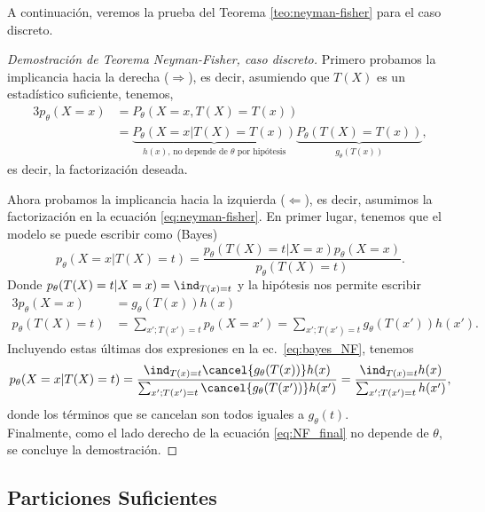 A continuación, veremos la prueba del Teorema \ref{teo:neyman-fisher} para el caso discreto. 


\begin{proof}[Demostración de Teorema Neyman-Fisher, caso discreto]
Primero probamos la implicancia hacia la derecha ($\Rightarrow$), es decir, asumiendo que $T(X)$ es un estadístico suficiente, tenemos,
	\begin{alignat*}{3}
		p_\theta(X=x) 	&= P_\theta(X=x, T(X)=T(x))\\
						&= \underbrace{P_\theta(X=x| T(X)=T(x))}_{h(x)\text{, no depende de $\theta$ por hipótesis}} \underbrace{P_\theta(T(X)=T(x))}_{g_\theta(T(x))},
	\end{alignat*}
	es decir, la factorización deseada.

	Ahora probamos la implicancia hacia la izquierda ($\Leftarrow$), es decir, asumimos la factorización en la ecuación \eqref{eq:neyman-fisher}. En primer lugar, tenemos que el modelo se puede escribir como (Bayes)
	\begin{equation}
		\label{eq:bayes_NF}
		p_\theta(X=x|T(X)=t)=  \frac{p_\theta(T(X)=t|X=x)p_\theta(X=x)}{p_\theta(T(X)=t)}.
	\end{equation}
	Donde $p_\theta(T(X)=t|X=x)= \ind_{T(x)=t}$ y la hipótesis nos permite escribir 
	\begin{alignat*}{3}
		p_\theta(X=x)&=  g_\theta(T(x))h(x)\\
		p_\theta(T(X)=t) &= \sum_{x';T(x')=t}p_\theta(X=x') = \sum_{x';T(x')=t}g_\theta(T(x'))h(x').
	\end{alignat*}
	Incluyendo estas últimas dos expresiones en la ec.~\eqref{eq:bayes_NF}, tenemos 
	\begin{equation}
		\label{eq:NF_final}
		p_\theta(X=x|T(X)=t)=  \frac{\ind_{T(x)=t}\cancel{g_\theta(T(x))}h(x)}{\sum_{x';T(x')=t}\cancel{g_\theta(T(x'))}h(x')}=  \frac{\ind_{T(x)=t}h(x)}{\sum_{x';T(x')=t}h(x')},
	\end{equation}
	donde los términos que se cancelan son todos iguales a $g_\theta(t)$.\\

	Finalmente, como el lado derecho de la ecuación \eqref{eq:NF_final} no depende de $\theta$, se concluye la demostración.
\end{proof}

\subsection{Particiones Suficientes}

